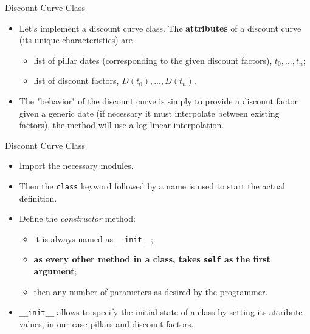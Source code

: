 \documentclass{beamer}
\begin{document}
\begin{frame}{Discount Curve Class}
  \begin{itemize}
  \item Let's implement a discount curve class. The \textbf{attributes} of a discount curve (its unique characteristics) are
      \begin{itemize}
      \item list of pillar dates (corresponding to the given discount factors), $t_0,...,t_{n}$;
      \item list of discount factors, $D(t_0),...,D(t_{n})$.
      \end{itemize}
  \item The "behavior" of the discount curve is simply to provide a discount factor given a generic date (if necessary it must interpolate between existing factors), the method will use a log-linear interpolation.
  \end{itemize}
\end{frame}
      
\begin{frame}{Discount Curve Class}
\begin{itemize}
  \item Import the necessary modules.
  \item Then the \texttt{class} keyword followed by a name is used to start the actual definition.
  \item Define the \emph{constructor} method:
    \begin{itemize}
    \item it is always named as \texttt{\_\_init\_\_};
    \item \textbf{as every other method in a class, takes \texttt{self} as the first argument};
    \item then any number of parameters as desired by the programmer.
    \end{itemize}
  \item \texttt{\_\_init\_\_} allows to specify the initial state of a class by setting its attribute values, in our case pillars and discount factors.
  \end{itemize}
\end{frame}
\end{document}
